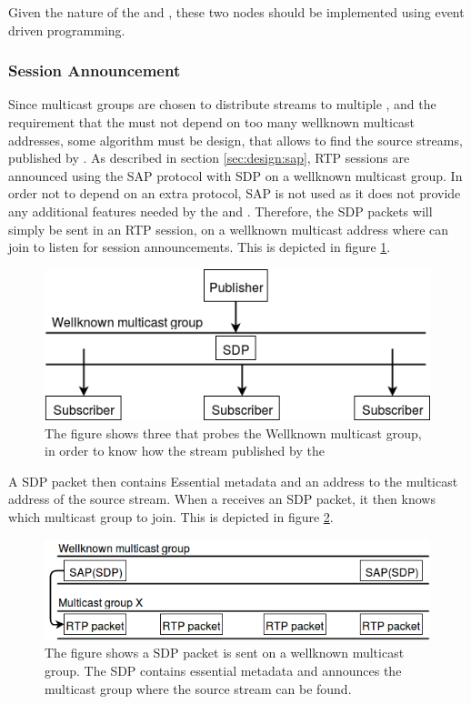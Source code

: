 Given the nature of the \pubs{} and \subs{}, these two nodes should be implemented using event driven programming.


\subsubsection{Session Announcement} \label{sec:design:sessionannouncement}
Since multicast groups are chosen to distribute streams to multiple \subs, and the requirement that the \sub{} must not depend on too many wellknown multicast addresses, some algorithm must be design, that allows \subs{} to find the source streams, published by \pubs. As described in section \ref{sec:design:sap}, RTP sessions are announced using the SAP protocol with SDP on a wellknown multicast group. In order not to depend on an extra protocol, SAP is not used as it does not provide any additional features needed by the \pubs{} and \subs{}. Therefore, the SDP packets will simply be sent in an RTP session, on a wellknown multicast address where \subs{} can join to listen for session announcements. This is depicted in figure \ref{fig:design:pubsub:session_probe}.

\begin{figure}[H]
	\centering
	\includegraphics[width=1\textwidth]{figures/session-announcement-probe}
	\caption{The figure shows three \subs{} that probes the Wellknown multicast group, in order to know how the stream published by the \pub{}} \label{fig:design:pubsub:session_probe}
\end{figure}

A SDP packet then contains Essential metadata and an address to the multicast address of the source stream. When a \subs{} receives an SDP packet, it then knows which multicast group to join. This is depicted in figure \ref{fig:design:sessionannouncement}.

\begin{figure}[H]
	\centering
	\includegraphics[width=\textwidth]{figures/sap-figure}
	 \caption{The figure shows a SDP packet is sent on a wellknown multicast group. The SDP contains essential metadata and announces the multicast group where the source stream can be found.}\label{fig:design:sessionannouncement}
\end{figure}


